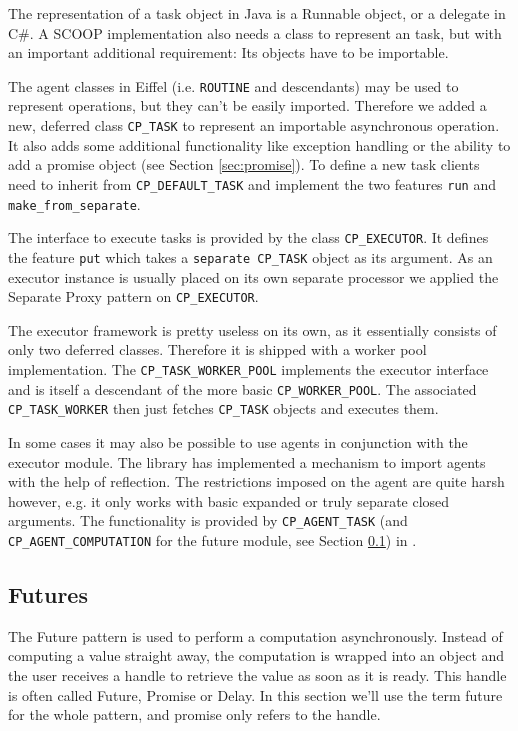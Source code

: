 The representation of a task object in Java is a Runnable object, or a delegate in C\#.
A SCOOP implementation also needs a class to represent an task, but with an important additional requirement: 
Its objects have to be importable.

The agent classes in Eiffel (i.e. \lstinline!ROUTINE! and descendants) may be used to represent operations, but they can't be easily imported.
Therefore we added a new, deferred class \lstinline!CP_TASK! to represent an importable asynchronous operation.
It also adds some additional functionality like exception handling or the ability to add a promise object (see Section \ref{sec:promise}).
To define a new task clients need to inherit from \lstinline!CP_DEFAULT_TASK! and implement the two features \lstinline!run! and \lstinline!make_from_separate!.

The interface to execute tasks is provided by the class \lstinline!CP_EXECUTOR!.
It defines the feature \lstinline!put! which takes a \lstinline!separate CP_TASK! object as its argument.
As an executor instance is usually placed on its own separate processor we applied the Separate Proxy pattern  on \lstinline!CP_EXECUTOR!.

The executor framework is pretty useless on its own, as it essentially consists of only two deferred classes.
Therefore it is shipped with a worker pool implementation.
The \lstinline!CP_TASK_WORKER_POOL! implements the executor interface and is itself a descendant of the more basic \lstinline!CP_WORKER_POOL!.
The associated \lstinline!CP_TASK_WORKER! then just fetches \lstinline!CP_TASK! objects and executes them.

In some cases it may also be possible to use agents in conjunction with the executor module.
The library has implemented a mechanism to import agents with the help of reflection.
The restrictions imposed on the agent are quite harsh however, e.g. it only works with basic expanded or truly separate closed arguments.
The functionality is provided by \lstinline!CP_AGENT_TASK! (and \lstinline!CP_AGENT_COMPUTATION! for the future module, see Section \ref{sec:futures}) in .

\subsection{Futures}
\label{sec:futures}

The Future pattern  is used to perform a computation asynchronously.
Instead of computing a value straight away, the computation is wrapped into an object and the user receives a handle to retrieve the value as soon as it is ready.
This handle is often called Future, Promise or Delay.
In this section we'll use the term future for the whole pattern, and promise only refers to the handle.

